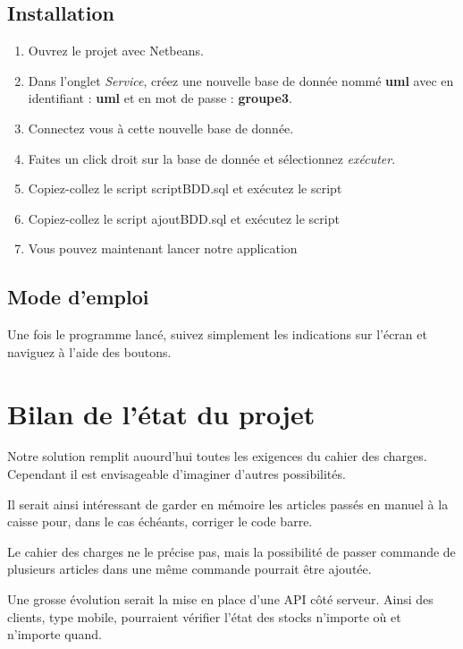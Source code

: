 \subsection{Installation}
\begin{enumerate}
	\item Ouvrez le projet avec Netbeans.
	\item Dans l'onglet \textit{Service}, créez une nouvelle base de donnée nommé \textbf{uml} avec en identifiant : \textbf{uml} et en mot de passe : \textbf{groupe3}. 
	\item Connectez vous à cette nouvelle base de donnée.
	\item Faites un click droit sur la base de donnée et sélectionnez \textit{exécuter}.
	\item Copiez-collez le script scriptBDD.sql et exécutez le script
	\item Copiez-collez le script ajoutBDD.sql et exécutez le script
	\item Vous pouvez maintenant lancer notre application
\end{enumerate}

\subsection{Mode d'emploi}
Une fois le programme lancé, suivez simplement les indications sur l'écran et naviguez à l'aide des boutons.

\section{Bilan de l'état du projet}
Notre solution remplit auourd'hui toutes les exigences du cahier des charges. Cependant il est envisageable d'imaginer d'autres possibilités. 

Il serait ainsi intéressant de garder en mémoire les articles passés en manuel à la caisse pour, dans le cas échéants, corriger le code barre.

Le cahier des charges ne le précise pas, mais la possibilité de passer commande de plusieurs articles dans une même commande pourrait être ajoutée. 

Une grosse évolution serait la mise en place d'une API côté serveur. Ainsi des clients, type mobile, pourraient vérifier l'état des stocks n'importe où et n'importe quand. 